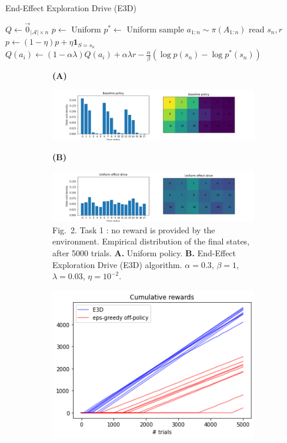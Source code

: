 \documentclass[runningheads]{llncs}
\begin{document}
\begin{algorithm}[t]
	\caption{End-Effect Exploration Drive (E3D)}\label{algo:E3D}
	\begin{algorithmic}
		\REQUIRE{$\alpha$, $\beta$, $\lambda$, $\eta$}
		\STATE $Q \leftarrow \vec{0}_{|\mathcal{A}|\times n}$
		\STATE $p \leftarrow$ Uniform
		\STATE $p^* \leftarrow$ Uniform
			\STATE sample $a_{1:n} \sim \pi(A_{1:n})$ 
			\STATE read $s_n,r$
			\STATE $p \leftarrow (1-\eta) p + \eta \mathbf{1}_{S=s_n} $ 
			    \STATE $Q(a_i) \leftarrow (1-\alpha\lambda) Q(a_i) + \alpha\lambda r - \frac{\alpha}{\beta} (\log p(s_n)-\log p^*(s_n))$ 
			\ENDFOR
		\ENDWHILE
	\end{algorithmic}
\end{algorithm}

\begin{figure}[t]
	\begin{subfigure}[b]{0.5\textwidth}
		\centerline{\bf (A)}
		\centerline{
			\includegraphics[width = \linewidth]{../figures/botteneck-baseline.png} 		
		}
		\centerline{\bf (B)}
		\centerline{\includegraphics[width = \linewidth]{../figures/botteneck-uniform-drive.png} }
		\caption{Fig.~2. Task 1 : no reward is provided by the environment. Empirical distribution of the final states, after 5000 trials. {\bf A.} Uniform policy. {\bf B.} End-Effect Exploration Drive (E3D) algorithm. $\alpha=0.3$, $\beta = 1$, $\lambda=0.03$, $\eta=10^{-2}$.}
	\end{subfigure}
	\hspace{1cm}
	\begin{subfigure}[b]{0.4\textwidth}
		\centerline{\includegraphics[width=.8\textwidth]{../figures/training-comparison.png}}

\end{subfigure}
\end{figure}
\end{document}
